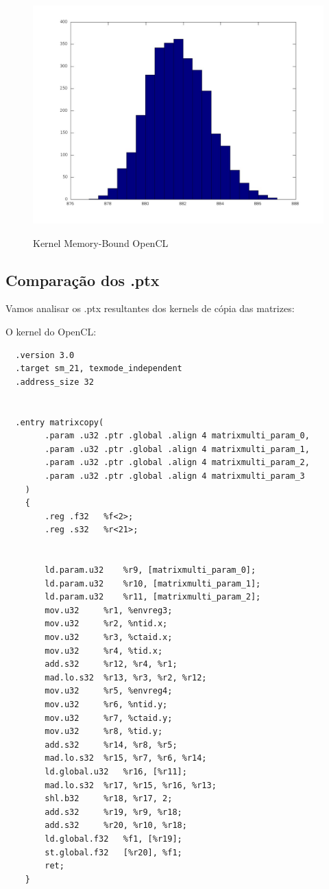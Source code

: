 \begin{figure}[H]
  \begin{center}
    \includegraphics[scale=0.3]{resultados_opencl_process_histo.jpg}
    \label{fig:Kernel Memory-Bound OpenCL}
    \caption{Kernel Memory-Bound OpenCL}
  \end{center}
\end{figure}

\subsection{Comparação dos .ptx}

Vamos analisar os .ptx resultantes dos kernels de cópia das matrizes:

O kernel do OpenCL: 

\begin{lstlisting}
  .version 3.0
  .target sm_21, texmode_independent
  .address_size 32


  .entry matrixcopy(
	    .param .u32 .ptr .global .align 4 matrixmulti_param_0,
	    .param .u32 .ptr .global .align 4 matrixmulti_param_1,
	    .param .u32 .ptr .global .align 4 matrixmulti_param_2,
	    .param .u32 .ptr .global .align 4 matrixmulti_param_3
    )
    {
	    .reg .f32 	%f<2>;
	    .reg .s32 	%r<21>;


	    ld.param.u32 	%r9, [matrixmulti_param_0];
	    ld.param.u32 	%r10, [matrixmulti_param_1];
	    ld.param.u32 	%r11, [matrixmulti_param_2];
	    mov.u32 	%r1, %envreg3;
	    mov.u32 	%r2, %ntid.x;
	    mov.u32 	%r3, %ctaid.x;
	    mov.u32 	%r4, %tid.x;
	    add.s32 	%r12, %r4, %r1;
	    mad.lo.s32 	%r13, %r3, %r2, %r12;
	    mov.u32 	%r5, %envreg4;
	    mov.u32 	%r6, %ntid.y;
	    mov.u32 	%r7, %ctaid.y;
	    mov.u32 	%r8, %tid.y;
	    add.s32 	%r14, %r8, %r5;
	    mad.lo.s32 	%r15, %r7, %r6, %r14;
	    ld.global.u32 	%r16, [%r11];
	    mad.lo.s32 	%r17, %r15, %r16, %r13;
	    shl.b32 	%r18, %r17, 2;
	    add.s32 	%r19, %r9, %r18;
	    add.s32 	%r20, %r10, %r18;
	    ld.global.f32 	%f1, [%r19];
	    st.global.f32 	[%r20], %f1;
	    ret;
    }
\end{lstlisting}

